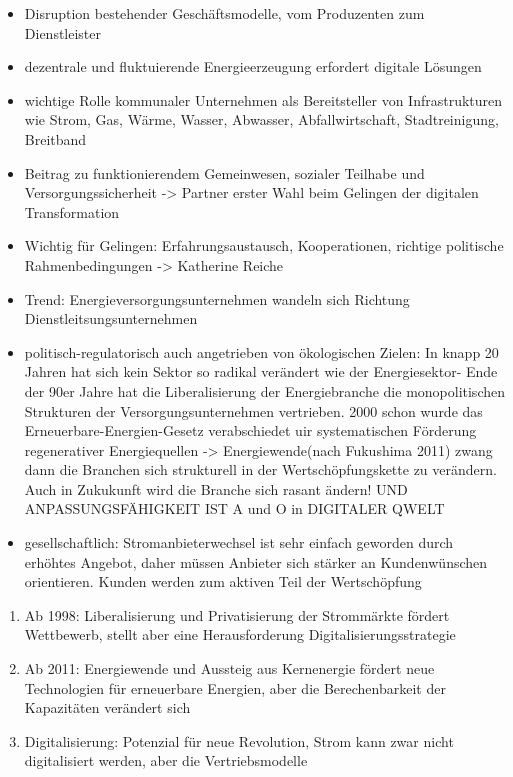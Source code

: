 \begin{itemize}
  \item Disruption bestehender Geschäftsmodelle, vom Produzenten zum Dienstleister \citep{Doleski2017}
  \item dezentrale und fluktuierende Energieerzeugung erfordert digitale Lösungen
  \item wichtige Rolle kommunaler Unternehmen als Bereitsteller von Infrastrukturen wie Strom, Gas, Wärme, Wasser, Abwasser, Abfallwirtschaft, Stadtreinigung, Breitband \citep{Doleski2017}
  \item Beitrag zu funktionierendem Gemeinwesen, sozialer Teilhabe und Versorgungssicherheit -> Partner erster Wahl beim Gelingen der digitalen Transformation
  \item Wichtig für Gelingen: Erfahrungsaustausch, Kooperationen, richtige politische Rahmenbedingungen -> Katherine Reiche
  \item Trend: Energieversorgungsunternehmen wandeln sich Richtung Dienstleitsungsunternehmen
  \item politisch-regulatorisch auch angetrieben von ökologischen Zielen: In knapp 20 Jahren hat sich kein Sektor so radikal verändert wie der Energiesektor- Ende der 90er Jahre hat die Liberalisierung der Energiebranche die monopolitischen Strukturen der Versorgungsunternehmen  vertrieben. 2000 schon wurde das Erneuerbare-Energien-Gesetz verabschiedet uir systematischen Förderung regenerativer Energiequellen -> Energiewende(nach Fukushima 2011) zwang dann die Branchen sich strukturell in der Wertschöpfungskette zu verändern. Auch in Zukukunft wird die Branche sich rasant ändern! UND ANPASSUNGSFÄHIGKEIT IST A und O in DIGITALER QWELT
  \item gesellschaftlich: Stromanbieterwechsel ist sehr einfach geworden durch erhöhtes Angebot, daher müssen Anbieter sich stärker an Kundenwünschen orientieren. Kunden werden zum aktiven Teil der Wertschöpfung
\end{itemize}

\begin{enumerate}
  \item Ab 1998: Liberalisierung und Privatisierung der Strommärkte fördert Wettbewerb, stellt aber eine Herausforderung Digitalisierungsstrategie
  \item Ab 2011: Energiewende und Aussteig aus Kernenergie fördert neue Technologien für erneuerbare Energien, aber die Berechenbarkeit der Kapazitäten verändert sich
  \item Digitalisierung: Potenzial für neue Revolution, Strom kann zwar nicht digitalisiert werden, aber die Vertriebsmodelle
\end{enumerate}



